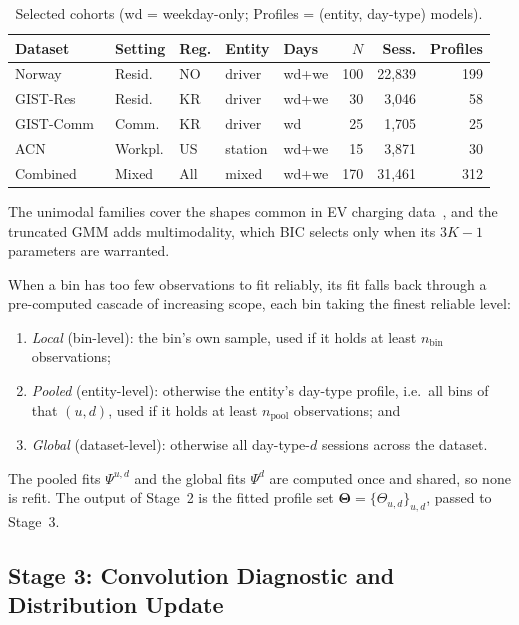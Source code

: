 \documentclass[journal]{IEEEtran}
\begin{document}
\begin{table}[t]
\centering
\caption{Selected cohorts (wd = weekday-only; Profiles = (entity, day-type) models).}
\label{tab:datasets}
\setlength{\tabcolsep}{3pt}
\footnotesize
\begin{tabular}{lllllrrr}
\toprule
\textbf{Dataset} & \textbf{Setting} & \textbf{Reg.} & \textbf{Entity} & \textbf{Days} & \textbf{$N$} & \textbf{Sess.} & \textbf{Profiles} \\
\midrule
Norway~\cite{sorensen2024}   & Resid. & NO & driver  & wd+we & 100 & 22{,}839 & 199 \\
GIST-Res~\cite{baek2024dataset}  & Resid. & KR & driver  & wd+we &  30 &  3{,}046 &  58 \\
GIST-Comm~\cite{baek2024dataset} & Comm.  & KR & driver  & wd    &  25 &  1{,}705 &  25 \\
ACN~\cite{lee2019acndata}        & Workpl.& US & station & wd+we &  15 &  3{,}871 &  30 \\
\midrule
Combined                     & Mixed  & All & mixed & wd+we & 170 & 31{,}461 & 312 \\
\bottomrule
\end{tabular}
\end{table}


The unimodal families cover the shapes common in EV charging data~\cite{flammini2019}, and the truncated GMM adds multimodality, which BIC selects only when its $3K - 1$ parameters are warranted.

When a bin has too few observations to fit reliably, its fit falls back through a pre-computed cascade of increasing scope, each bin taking the finest reliable level:
\begin{enumerate}
    \item \emph{Local} (bin-level): the bin's own sample, used if it holds at least $n_{\mathrm{bin}}$ observations;
    \item \emph{Pooled} (entity-level): otherwise the entity's day-type profile, i.e.\ all bins of that $(u,d)$, used if it holds at least $n_{\mathrm{pool}}$ observations; and
    \item \emph{Global} (dataset-level): otherwise all day-type-$d$ sessions across the dataset.
\end{enumerate}
The pooled fits $\Psi^{u,d}$ and the global fits $\Psi^{d}$ are computed once and shared, so none is refit. The output of Stage~2 is the fitted profile set $\boldsymbol{\Theta} = \{\Theta_{u,d}\}_{u,d}$, passed to Stage~3.

\subsection{Stage 3: Convolution Diagnostic and Distribution Update}
\label{subsec:stage3}
\end{document}
